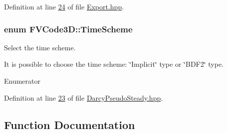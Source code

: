 Definition at line \hyperlink{Export_8hpp_source_l00024}{24} of file \hyperlink{Export_8hpp_source}{Export.\+hpp}.

\subsubsection[{\texorpdfstring{Time\+Scheme}{TimeScheme}}]{\setlength{\rightskip}{0pt plus 5cm}enum {\bf F\+V\+Code3\+D\+::\+Time\+Scheme}}\hypertarget{namespaceFVCode3D_ad641b84e1a5460b6a35354f61f27009a}{}\label{namespaceFVCode3D_ad641b84e1a5460b6a35354f61f27009a}


Select the time scheme. 

It is possible to choose the time scheme\+: \char`\"{}\+Implicit\char`\"{} type or \char`\"{}\+B\+D\+F2\char`\"{} type. \begin{Desc}
\item[Enumerator]\par
\begin{description}
\item[{\em 
Implicit\hypertarget{namespaceFVCode3D_ad641b84e1a5460b6a35354f61f27009aa349f3bb73703f75dbaa1ba38998671d1}{}\label{namespaceFVCode3D_ad641b84e1a5460b6a35354f61f27009aa349f3bb73703f75dbaa1ba38998671d1}
}]\item[{\em 
B\+D\+F2\hypertarget{namespaceFVCode3D_ad641b84e1a5460b6a35354f61f27009aa3cbb28a9274dccd4cacd41ad5d823bed}{}\label{namespaceFVCode3D_ad641b84e1a5460b6a35354f61f27009aa3cbb28a9274dccd4cacd41ad5d823bed}
}]\end{description}
\end{Desc}


Definition at line \hyperlink{DarcyPseudoSteady_8hpp_source_l00023}{23} of file \hyperlink{DarcyPseudoSteady_8hpp_source}{Darcy\+Pseudo\+Steady.\+hpp}.



\subsection{Function Documentation}
